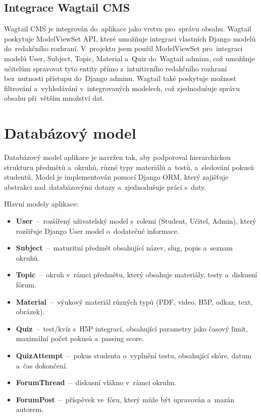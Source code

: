 \documentclass[12pt, a4paper,
twoside,
openany
]{report}
\begin{document}
	\subsection{Integrace Wagtail CMS}
	
	Wagtail CMS je integrován do~aplikace jako vrstva pro~správu obsahu. Wagtail poskytuje ModelViewSet API, které umožňuje integraci vlastních Django modelů do~redakčního rozhraní. V~projektu jsem použil ModelViewSet pro~integraci modelů User, Subject, Topic, Material a~Quiz do~Wagtail adminu, což umožňuje učitelům spravovat tyto entity přímo z~intuitivního redakčního rozhraní bez~nutnosti přístupu do~Django adminu. Wagtail také poskytuje možnost filtrování a~vyhledávání v~integrovaných modelech, což zjednodušuje správu obsahu při~větším množství dat.

	\section{Databázový model}
	
	
	Databázový model aplikace je navržen tak, aby podporoval hierarchickou strukturu předmětů a~okruhů, různé typy materiálů a~testů, a~sledování pokusů studentů. Model je implementován pomocí Django ORM, který zajišťuje abstrakci nad~databázovými dotazy a~zjednodušuje práci s~daty.
	
	Hlavní modely aplikace:
	\begin{itemize}
		\item \textbf{User}~--~rozšířený uživatelský model s~rolemi (Student, Učitel, Admin), který rozšiřuje Django User model o~dodatečné informace.
		\item \textbf{Subject}~--~maturitní předmět obsahující název, slug, popis a~seznam okruhů.
		\item \textbf{Topic}~--~okruh v~rámci předmětu, který obsahuje materiály, testy a~diskusní fórum.
		\item \textbf{Material}~--~výukový materiál různých typů (PDF, video, H5P, odkaz, text, obrázek).
		\item \textbf{Quiz}~--~test/kvíz s~H5P integrací, obsahující parametry jako časový limit, maximální počet pokusů a~passing score.
		\item \textbf{QuizAttempt}~--~pokus studenta o~vyplnění testu, obsahující skóre, datum a~čas dokončení.
		\item \textbf{ForumThread}~--~diskusní vlákno v~rámci okruhu.
		\item \textbf{ForumPost}~--~příspěvek ve~fóru, který může být upravován a~mazán autorem.
	\end{itemize}
	
\end{document}
